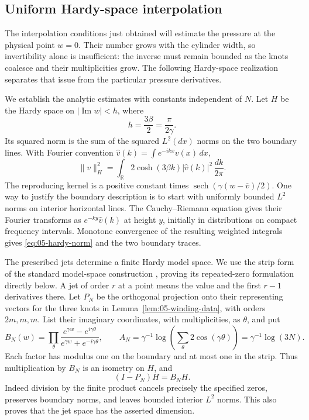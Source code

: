 \subsection{Uniform Hardy-space interpolation}

The interpolation conditions just obtained will estimate the pressure
at the physical point \(w=0\). Their number grows with the cylinder
width, so invertibility alone is insufficient: the inverse must remain
bounded as the knots coalesce and their multiplicities grow. The
following Hardy-space realization separates that issue from the
particular pressure derivatives.

We establish the analytic estimates with constants independent of \(N\). Let \(H\) be the Hardy space on \(|\operatorname{Im}w|<h\), where
\[
 h=\frac{3\beta}{2}=\frac{\pi}{2\gamma}.
\]
Its squared norm is the sum of the squared \(L^2(dx)\) norms on the two boundary lines. With Fourier convention \(\widehat v(k)=\int e^{-ikx}v(x)\,dx\),
\begin{equation}
 \|v\|_H^2=\int_{\mathbb R}2\cosh(3\beta k)
            |\widehat v(k)|^2\,\frac{dk}{2\pi}.
 \label{eq:05-hardy-norm}
\end{equation}
The reproducing kernel is a positive constant times
\(\operatorname{sech}(\gamma(w-\overline v)/2)\).
One way to justify the boundary description is to start with uniformly bounded \(L^2\) norms on interior horizontal lines. The Cauchy--Riemann equation gives their Fourier transforms as \(e^{-ky}\widehat v(k)\) at height \(y\), initially in distributions on compact frequency intervals. Monotone convergence of the resulting weighted integrals gives \eqref{eq:05-hardy-norm} and the two boundary traces.

The prescribed jets determine a finite Hardy model space. We use the
strip form of the standard model-space construction
\cite[Section~1]{Sarason2007}, proving its repeated-zero formulation
directly below. A jet of order \(r\) at a point means the value and the first
\(r-1\) derivatives there. Let \(P_N\) be the orthogonal projection
onto their representing vectors for the three knots in
Lemma~\ref{lem:05-winding-data}, with orders \(2m,m,m\). List their imaginary coordinates, with multiplicities, as \(\theta\), and put
\begin{equation}
 B_N(w)=\prod_\theta
   \frac{e^{\gamma w}-e^{i\gamma\theta}}
        {e^{\gamma w}+e^{-i\gamma\theta}},
 \qquad
 A_N=\gamma^{-1}\log\!\left(\sum_\theta2\cos(\gamma\theta)\right)
     =\gamma^{-1}\log(3N).
 \label{eq:05-blaschke}
\end{equation}
Each factor has modulus one on the boundary and at most one in the strip. Thus multiplication by \(B_N\) is an isometry on \(H\), and
\begin{equation}
 (I-P_N)H=B_NH.
 \label{eq:05-model-space}
\end{equation}
Indeed division by the finite product cancels precisely the specified zeros, preserves boundary norms, and leaves bounded interior \(L^2\) norms. This also proves that the jet space has the asserted dimension.

